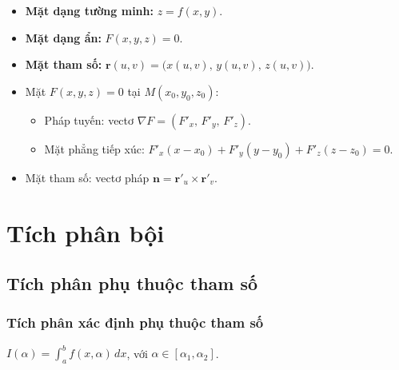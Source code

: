 \documentclass[12pt,a4paper]{article}
\begin{document}
\begin{dinhnghia}
  \begin{itemize}
    \item \textbf{Mặt dạng tường minh:} $z = f(x, y)$.
    \item \textbf{Mặt dạng ẩn:} $F(x, y, z) = 0$.
    \item \textbf{Mặt tham số:} $\mathbf{r}(u, v) = \bigl(x(u,v),\, y(u,v),\, z(u,v)\bigr)$.
  \end{itemize}
\end{dinhnghia}

\begin{congthuc}[title={Mặt phẳng tiếp xúc và pháp tuyến}]
  \begin{itemize}
    \item Mặt $F(x,y,z) = 0$ tại $M(x_0, y_0, z_0)$:
      \begin{itemize}
        \item Pháp tuyến: vectơ $\nabla F = (F'_x,\, F'_y,\, F'_z)$.
        \item Mặt phẳng tiếp xúc: $F'_x(x-x_0) + F'_y(y-y_0) + F'_z(z-z_0) = 0$.
      \end{itemize}
    \item Mặt tham số: vectơ pháp $\mathbf{n} = \mathbf{r}'_u \times \mathbf{r}'_v$.
  \end{itemize}
\end{congthuc}

\section{Tích phân bội}

\subsection{Tích phân phụ thuộc tham số}

\subsubsection{Tích phân xác định phụ thuộc tham số}

\begin{dinhnghia}
  $I(\alpha) = \displaystyle\int_a^b f(x, \alpha)\,dx$, với $\alpha \in [\alpha_1, \alpha_2]$.
\end{dinhnghia}
\end{document}
